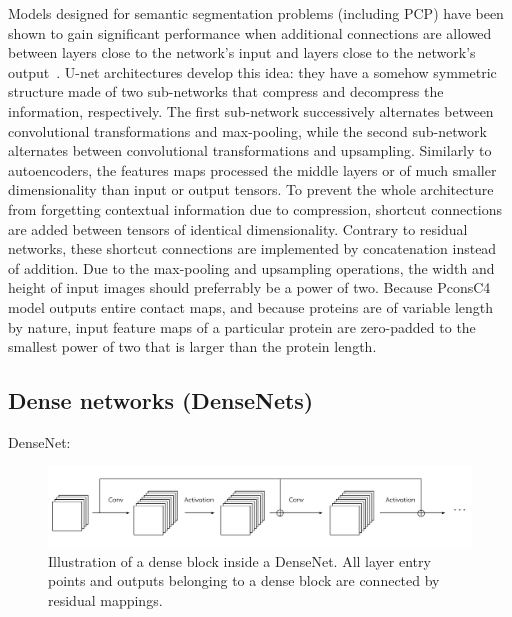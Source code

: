         Models designed for semantic segmentation problems (including PCP) have been shown
        to gain significant performance when additional connections are allowed between
        layers close to the network's input and layers close to the network's output~\cite{huang2017densely}.
        U-net architectures develop this idea: they have a somehow symmetric structure made of two sub-networks
        that compress and decompress the information, respectively.
        The first sub-network successively alternates between convolutional transformations
        and max-pooling, while the second sub-network alternates between convolutional
        transformations and upsampling. Similarly to autoencoders, the features maps
        processed the middle layers or of much smaller dimensionality than input or output tensors.
        To prevent the whole architecture from forgetting contextual information due to
        compression, shortcut connections are added between tensors of identical dimensionality.
        Contrary to residual networks, these shortcut connections are implemented by
        concatenation instead of addition. Due to the max-pooling and upsampling operations,
        the width and height of input images should preferrably be a power of two.
        Because PconsC4 model outputs entire contact maps, and because proteins are
        of variable length by nature, input feature maps of a particular protein are zero-padded
        to the smallest power of two that is larger than the protein length.

    \subsection{Dense networks (DenseNets)}

        DenseNet: \cite{huang2017densely}

        \begin{figure}[H]
            \begin{center}
                \includegraphics[width=\textwidth, keepaspectratio]{imgs/densenet.png}
                \caption{Illustration of a dense block inside a DenseNet.
                All layer entry points and outputs belonging to a dense block are connected
                by residual mappings.}
                \label{densenet}
            \end{center}
        \end{figure}



